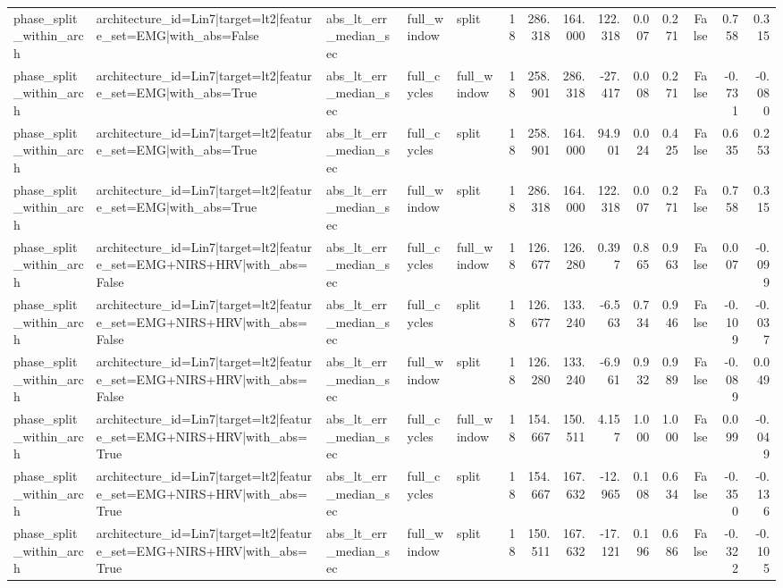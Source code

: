 \begin{table}
\begin{tabular}{lllllrrrrrrrrr}
phase_split_within_arch & architecture_id=Lin7|target=lt2|feature_set=EMG|with_abs=False & abs_lt_err_median_sec & full_window & split & 18 & 286.318 & 164.000 & 122.318 & 0.007 & 0.271 & False & 0.758 & 0.315 \\
phase_split_within_arch & architecture_id=Lin7|target=lt2|feature_set=EMG|with_abs=True & abs_lt_err_median_sec & full_cycles & full_window & 18 & 258.901 & 286.318 & -27.417 & 0.008 & 0.271 & False & -0.731 & -0.080 \\
phase_split_within_arch & architecture_id=Lin7|target=lt2|feature_set=EMG|with_abs=True & abs_lt_err_median_sec & full_cycles & split & 18 & 258.901 & 164.000 & 94.901 & 0.024 & 0.425 & False & 0.635 & 0.253 \\
phase_split_within_arch & architecture_id=Lin7|target=lt2|feature_set=EMG|with_abs=True & abs_lt_err_median_sec & full_window & split & 18 & 286.318 & 164.000 & 122.318 & 0.007 & 0.271 & False & 0.758 & 0.315 \\
phase_split_within_arch & architecture_id=Lin7|target=lt2|feature_set=EMG+NIRS+HRV|with_abs=False & abs_lt_err_median_sec & full_cycles & full_window & 18 & 126.677 & 126.280 & 0.397 & 0.865 & 0.963 & False & 0.007 & -0.099 \\
phase_split_within_arch & architecture_id=Lin7|target=lt2|feature_set=EMG+NIRS+HRV|with_abs=False & abs_lt_err_median_sec & full_cycles & split & 18 & 126.677 & 133.240 & -6.563 & 0.734 & 0.946 & False & -0.109 & -0.037 \\
phase_split_within_arch & architecture_id=Lin7|target=lt2|feature_set=EMG+NIRS+HRV|with_abs=False & abs_lt_err_median_sec & full_window & split & 18 & 126.280 & 133.240 & -6.961 & 0.932 & 0.989 & False & -0.089 & 0.049 \\
phase_split_within_arch & architecture_id=Lin7|target=lt2|feature_set=EMG+NIRS+HRV|with_abs=True & abs_lt_err_median_sec & full_cycles & full_window & 18 & 154.667 & 150.511 & 4.157 & 1.000 & 1.000 & False & 0.099 & -0.049 \\
phase_split_within_arch & architecture_id=Lin7|target=lt2|feature_set=EMG+NIRS+HRV|with_abs=True & abs_lt_err_median_sec & full_cycles & split & 18 & 154.667 & 167.632 & -12.965 & 0.108 & 0.634 & False & -0.350 & -0.136 \\
phase_split_within_arch & architecture_id=Lin7|target=lt2|feature_set=EMG+NIRS+HRV|with_abs=True & abs_lt_err_median_sec & full_window & split & 18 & 150.511 & 167.632 & -17.121 & 0.196 & 0.686 & False & -0.322 & -0.105 \\

\end{tabular}
\end{table}
